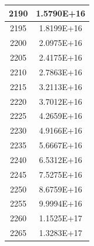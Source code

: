 \documentclass[a4paper]{article}
\begin{document}
\begin{tabular}{|c|c|}
		\hline
		2190 & 1.5790E+16 \\
		\hline
		2195 & 1.8199E+16 \\
		\hline
		2200 & 2.0975E+16 \\
		\hline
		2205 & 2.4175E+16 \\
		\hline
		2210 & 2.7863E+16 \\
		\hline
		2215 & 3.2113E+16 \\
		\hline
		2220 & 3.7012E+16 \\
		\hline
		2225 & 4.2659E+16 \\
		\hline
		2230 & 4.9166E+16 \\
		\hline
		2235 & 5.6667E+16 \\
		\hline
		2240 & 6.5312E+16 \\
		\hline
		2245 & 7.5275E+16 \\
		\hline
		2250 & 8.6759E+16 \\
		\hline
		2255 & 9.9994E+16 \\
		\hline
		2260 & 1.1525E+17 \\
		\hline
		2265 & 1.3283E+17 \\
		\hline
	\end{tabular}
	\hfill
\end{document}
